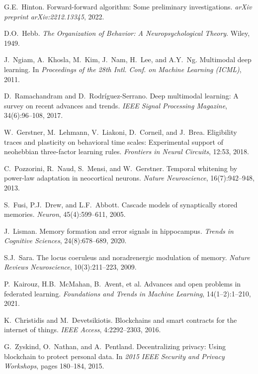 \documentclass[11pt]{article}
\begin{document}
\begin{thebibliography}{99}
G.E.~Hinton.
\newblock Forward-forward algorithm: Some preliminary investigations.
\newblock \emph{arXiv preprint arXiv:2212.13345}, 2022.

D.O.~Hebb.
\newblock \emph{The Organization of Behavior: A Neuropsychological Theory}.
\newblock Wiley, 1949.

J.~Ngiam, A.~Khosla, M.~Kim, J.~Nam, H.~Lee, and A.Y.~Ng.
\newblock Multimodal deep learning.
\newblock In \emph{Proceedings of the 28th Intl. Conf. on Machine Learning (ICML)}, 2011.

D.~Ramachandram and D.~Rodr\'{i}guez-Serrano.
\newblock Deep multimodal learning: A survey on recent advances and trends.
\newblock \emph{IEEE Signal Processing Magazine}, 34(6):96--108, 2017.

W.~Gerstner, M.~Lehmann, V.~Liakoni, D.~Corneil, and J.~Brea.
\newblock Eligibility traces and plasticity on behavioral time scales: Experimental support of neohebbian three-factor learning rules.
\newblock \emph{Frontiers in Neural Circuits}, 12:53, 2018.

C.~Pozzorini, R.~Naud, S.~Mensi, and W.~Gerstner.
\newblock Temporal whitening by power-law adaptation in neocortical neurons.
\newblock \emph{Nature Neuroscience}, 16(7):942--948, 2013.

S.~Fusi, P.J.~Drew, and L.F.~Abbott.
\newblock Cascade models of synaptically stored memories.
\newblock \emph{Neuron}, 45(4):599--611, 2005.

J.~Lisman.
\newblock Memory formation and error signals in hippocampus.
\newblock \emph{Trends in Cognitive Sciences}, 24(8):678--689, 2020.

S.J.~Sara.
\newblock The locus coeruleus and noradrenergic modulation of memory.
\newblock \emph{Nature Reviews Neuroscience}, 10(3):211--223, 2009.

P.~Kairouz, H.B.~McMahan, B.~Avent, et al.
\newblock Advances and open problems in federated learning.
\newblock \emph{Foundations and Trends in Machine Learning}, 14(1--2):1--210, 2021.

K.~Christidis and M.~Devetsikiotis.
\newblock Blockchains and smart contracts for the internet of things.
\newblock \emph{IEEE Access}, 4:2292--2303, 2016.

G.~Zyskind, O.~Nathan, and A.~Pentland.
\newblock Decentralizing privacy: Using blockchain to protect personal data.
\newblock In \emph{2015 IEEE Security and Privacy Workshops}, pages 180--184, 2015.


\end{thebibliography}
\end{document}
